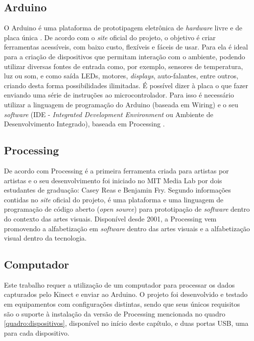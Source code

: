 \subsection{Arduino}

O Arduino é uma plataforma de prototipagem eletrônica de \textit{hardware} livre e de placa única \cite{arduino}. De acordo com o \textit{site} oficial do projeto, o objetivo é criar ferramentas acessíveis, com baixo custo, flexíveis e fáceis de usar. Para  ela é ideal para a criação de dispositivos que permitam interação com o ambiente, podendo utilizar diversas fontes de entrada como, por exemplo, sensores de temperatura, luz ou som, e como saída LEDs, motores, \textit{displays}, auto-falantes, entre outros, criando desta forma possibilidades ilimitadas. É possível dizer à placa o que fazer enviando uma série de instruções ao microcontrolador. Para isso é necessário utilizar a linguagem de programação do Arduino (baseada em Wiring) e o seu \textit{software} (IDE - \textit{Integrated Development Environment} ou Ambiente de Desenvolvimento Integrado), baseada em Processing \cite{arduino}. 


\subsection{Processing}
\label{sec:processing}

De acordo com  Processing é a primeira ferramenta criada para artistas por artistas e o seu desenvolvimento foi iniciado no MIT Media Lab por dois estudantes de graduação: Casey Reas e Benjamin Fry. Segundo informações contidas no \textit{site} oficial do projeto,  é uma plataforma e uma linguagem de programação de código aberto (\textit{open source}) para prototipação de \textit{software} dentro do contexto das artes visuais. Disponível desde 2001, a Processing vem promovendo a alfabetização em \textit{software} dentro das artes visuais e a alfabetização visual dentro da tecnologia. 

\subsection{Computador}
\label{sec:computador}

Este trabalho requer a utilização de um computador para processar os dados capturados pelo Kinect e enviar ao Arduino. O projeto foi desenvolvido e testado em equipamentos com configurações distintas, sendo que seus únicos requisitos são o suporte à instalação da versão de Processing mencionada no quadro \ref{quadro:dispositivos}, disponível no início deste capítulo, e duas portas USB, uma para cada dispositivo.



